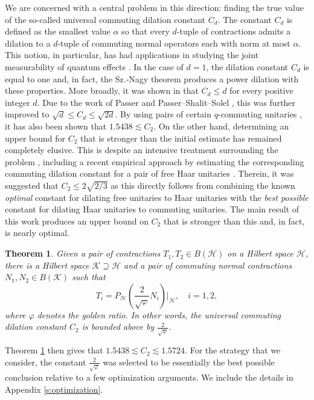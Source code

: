 \documentclass[10pt]{amsart}
\renewcommand{\H}{{\mathcal{H}}}
\newcommand{\K}{{\mathcal{K}}}
\renewcommand{\phi}{\varphi}
\newtheorem{theoremx}{Theorem}
\begin{document}
We are concerned with a central problem in this direction: finding the true value of the so-called universal commuting dilation constant $C_d$. The constant $C_d$ is defined as the smallest value $\alpha$ so that every $d$-tuple of contractions admits a dilation to a $d$-tuple of commuting normal operators each with norm at most $\alpha$. This notion, in particular, has had applications in studying the joint measurability of quantum effects \cite{bluhm2018joint}. In the case of $d=1$, the dilation constant $C_d$ is equal to one and, in fact, the Sz.-Nagy theorem produces a power dilation with these properties. More broadly, it was shown in \cite[Section 7]{davidson2017dilations} that $C_d\leq d$ for every positive integer $d$. Due to the work of Passer and Passer--Shalit--Solel \cites{passer2018minimal, passer2019shape}, this was further improved to $\sqrt{d}\leq C_d \leq \sqrt{2d}$. By using pairs of certain $q$-commuting unitaries \cite[Section 7]{gerhold2022dilations}, it has also been shown that $1.5438\lesssim C_2$. On the other hand, determining an upper bound for $C_2$ that is stronger than the initial estimate \cite[Section 7]{davidson2017dilations} has remained completely elusive. This is despite an intensive treatment surrounding the problem \cites{gerhold2021dilations, gerhold2022dilations, passer2018minimal, passer2019shape}, including a recent empirical approach by estimating the corresponding commuting dilation constant for a pair of free Haar unitaries \cite{gerhold2025empirical}. Therein, it was suggested that $C_2\leq 2\sqrt{2/3}$ as this directly follows from combining the known \emph{optimal} constant for dilating free unitaries to Haar unitaries \cite[Corollary 3.8]{gerhold2021dilations} with the \emph{best possible} constant for dilating Haar unitaries to commuting unitaries. The main result of this work produces an upper bound on $C_2$ that is stronger than this and, in fact, is nearly optimal.

\begin{theoremx}\label{t:a}
    Given a pair of contractions $T_1, T_2\in B(\H)$ on a Hilbert space $\H$, there is a Hilbert space $\K\supseteq\H$ and a pair of commuting normal contractions $N_1, N_2\in B(\K)$ such that
    \[
        T_i =  P_\H \left(\frac{2}{\sqrt{\phi}} N_i \right)|_{\H}, \quad i=1,2,
    \]
    where $\phi$ denotes the golden ratio. In other words, the universal commuting dilation constant $C_2$ is bounded above by $\frac{2}{\sqrt{\phi}}$.
\end{theoremx}

Theorem \ref{t:a} then gives that $1.5438\lesssim C_2 \lesssim 1.5724$. For the strategy that we consider, the constant $\frac{2}{\sqrt{\phi}}$ was selected to be essentially the best possible conclusion relative to a few optimization arguments. We include the details in Appendix \ref{s:optimization}.
\end{document}
